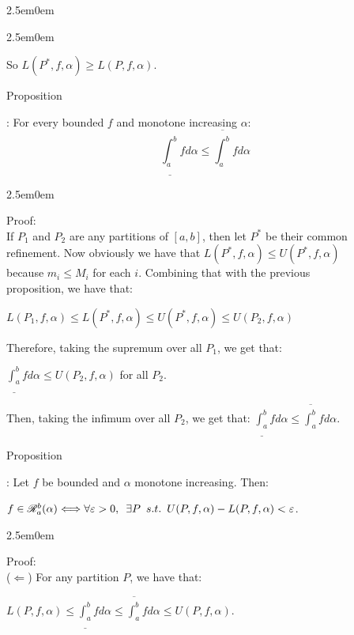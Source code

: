 \documentclass{book}
\newcommand{\hTwo}{%
   \color{MidnightBlue}%
   \fontsize{13}{15}\selectfont%
}
\newcommand{\hThree}{%
   \color{PineGreen!85!Orange}
   \fontsize{13}{15}\selectfont%
}
\newenvironment{myIndent}{%
   \begin{adjustwidth}{2.5em}{0em}%
}{%
   \end{adjustwidth}%
}
\newcommand{\suchthat}{ \hspace{0.5em}s.t.\hspace{0.5em}}
\newcommand{\myHS}{ \hspace{0.5em}}
\newcounter{PropNumber}
\newcommand{\propCount}[1][1]{%
   \addtocounter{PropNumber}{#1}%
   \thePropNumber%
}
\newcommand{\retTwo}{\hfill\bigbreak}
\begin{document}
      {\begin{myIndent}\hTwo{\begin{myIndent}\hThree

      So $L(P^*, f, \alpha) \geq L(P, f, \alpha)$.\retTwo\retTwo
   \end{myIndent}}

   Proposition \propCount: For every bounded $f$ and monotone increasing $\alpha$:\\ [-23pt]
   
   \[\underline{\int_a^b}fd\alpha \leq \overline{\int_a^b}fd\alpha\]

   
   {\begin{myIndent}\hThree
      Proof:\\
      If $P_1$ and $P_2$ are any partitions of $[a, b]$, then let $P^*$ be their common\\ refinement. Now obviously we have that $L(P^*, f, \alpha) \leq U(P^*, f, \alpha)$\\ because $m_i \leq M_i$ for each $i$. Combining that with the previous\\ proposition, we have that:

      {\centering $L(P_1, f, \alpha) \leq L(P^*, f, \alpha) \leq U(P^*, f, \alpha) \leq U(P_2, f, \alpha)$\retTwo\par}

      Therefore, taking the supremum over all $P_1$, we get that: 

      {\centering$\underline{\int_a^b}fd\alpha \leq U(P_2, f, \alpha)$ for all $P_2$.\retTwo\par}

      Then, taking the infimum over all $P_2$, we get that: $\underline{\int_a^b}fd\alpha \leq \overline{\int_a^b}fd\alpha$.
   \end{myIndent}}

   \newpage

   Proposition \propCount: Let $f$ be bounded and $\alpha$ monotone increasing. Then:
   
   {\centering $f \in \mathscr{R}_a^b(\alpha) \Longleftrightarrow \forall \varepsilon > 0,\myHS \exists P \suchthat U(P, f, \alpha) - L(P, f, \alpha) < \varepsilon$.\retTwo\par}

   {\begin{myIndent}\hThree
      Proof:\\
      ($\Longleftarrow$) For any partition $P$, we have that:
      
      {\centering$L(P, f, \alpha) \leq \underline{\int_a^b}fd\alpha \leq \overline{\int_a^b}fd\alpha \leq U(P, f, \alpha)$.\retTwo\par}


\end{myIndent}}
\end{myIndent}}
\end{document}
